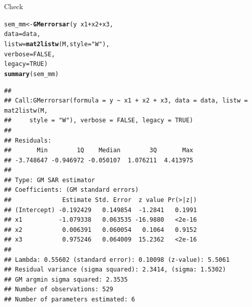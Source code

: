 \documentclass[english,12pt]{book}\usepackage[]{graphicx}\usepackage[]{xcolor}
\makeatletter
\newcommand{\hlnum}[1]{\textcolor[rgb]{0.686,0.059,0.569}{#1}}%
\newcommand{\hlsng}[1]{\textcolor[rgb]{0.192,0.494,0.8}{#1}}%
\newcommand{\hlopt}[1]{\textcolor[rgb]{0,0,0}{#1}}%
\newcommand{\hldef}[1]{\textcolor[rgb]{0.345,0.345,0.345}{#1}}%
\newcommand{\hlkwb}[1]{\textcolor[rgb]{0.69,0.353,0.396}{#1}}%
\newcommand{\hlkwc}[1]{\textcolor[rgb]{0.333,0.667,0.333}{#1}}%
\newcommand{\hlkwd}[1]{\textcolor[rgb]{0.737,0.353,0.396}{\textbf{#1}}}%
\newenvironment{kframe}{%
 \def\at@end@of@kframe{}%
 \ifinner\ifhmode%
  \def\at@end@of@kframe{\end{minipage}}%
  \begin{minipage}{\columnwidth}%
 \fi\fi%
 \def\FrameCommand##1{\hskip\@totalleftmargin \hskip-\fboxsep
 \colorbox{shadecolor}{##1}\hskip-\fboxsep
     \hskip-\linewidth \hskip-\@totalleftmargin \hskip\columnwidth}%
 \MakeFramed {\advance\hsize-\width
   \@totalleftmargin\z@ \linewidth\hsize
   \@setminipage}}%
 {\par\unskip\endMakeFramed%
 \at@end@of@kframe}
\newenvironment{knitrout}{}{} %
\makeatother
\begin{document}
Check
\begin{knitrout}
\color{fgcolor}\begin{kframe}
\begin{alltt}
\hldef{sem_mm}    \hlkwb{<-} \hlkwd{GMerrorsar}\hldef{(y} \hlopt{~} \hldef{x1} \hlopt{+} \hldef{x2} \hlopt{+} \hldef{x3,}
                        \hlkwc{data} \hldef{= data,}
                        \hlkwc{listw} \hldef{=} \hlkwd{mat2listw}\hldef{(M,} \hlkwc{style} \hldef{=} \hlsng{"W"}\hldef{),}
                        \hlkwc{verbose} \hldef{=} \hlnum{FALSE}\hldef{,}
                        \hlkwc{legacy} \hldef{=}  \hlnum{TRUE}\hldef{)}
\hlkwd{summary}\hldef{(sem_mm)}
\end{alltt}
\begin{verbatim}
## 
## Call:GMerrorsar(formula = y ~ x1 + x2 + x3, data = data, listw = mat2listw(M, 
##     style = "W"), verbose = FALSE, legacy = TRUE)
## 
## Residuals:
##       Min        1Q    Median        3Q       Max 
## -3.748647 -0.946972 -0.050107  1.076211  4.413975 
## 
## Type: GM SAR estimator
## Coefficients: (GM standard errors) 
##              Estimate Std. Error  z value Pr(>|z|)
## (Intercept) -0.192429   0.149854  -1.2841   0.1991
## x1          -1.079338   0.063535 -16.9880   <2e-16
## x2           0.006391   0.060054   0.1064   0.9152
## x3           0.975246   0.064009  15.2362   <2e-16
## 
## Lambda: 0.55602 (standard error): 0.10098 (z-value): 5.5061
## Residual variance (sigma squared): 2.3414, (sigma: 1.5302)
## GM argmin sigma squared: 2.3535
## Number of observations: 529 
## Number of parameters estimated: 6
\end{verbatim}
\end{kframe}
\end{knitrout}
\end{document}
